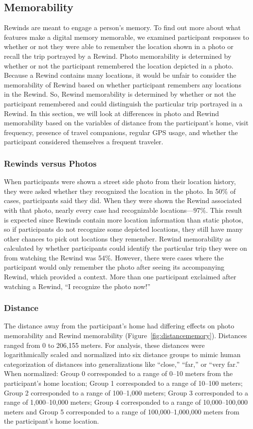 \documentclass{sigchi}
\begin{document}
\subsection{Memorability}
Rewinds are meant to engage a person's memory. To find out more about what features make a digital memory memorable, we examined participant responses to whether or not they were able to remember the location shown in a photo or recall the trip portrayed by a Rewind. Photo memorability is determined by whether or not the participant remembered the location depicted in a photo. Because a Rewind contains many locations, it would be unfair to consider the memorability of Rewind based on whether participant remembers any locations in the Rewind. So, Rewind memorability is determined by whether or not the participant remembered and could distinguish the particular trip portrayed in a Rewind. In this section, we will look at differences in photo and Rewind memorability based on the variables of distance from the participant's home, visit frequency, presence of travel companions, regular GPS usage, and whether the participant considered themselves a frequent traveler.

\subsubsection{Rewinds versus Photos}
When participants were shown a street side photo from their location history, they were asked whether they recognized the location in the photo. In 50\% of cases, participants said they did. When they were shown the Rewind associated with that photo, nearly every case had recognizable locations---97\%. This result is expected since Rewinds contain more location information than static photos, so if participants do not recognize some depicted locations, they still have many other chances to pick out locations they remember. Rewind memorability as calculated by whether participants could identify the particular trip they were on from watching the Rewind was 54\%. However, there were cases where the participant would only remember the photo after seeing its accompanying Rewind, which provided a context. More than one participant exclaimed after watching a Rewind, ``I recognize the photo now!''

\subsubsection{Distance}
The distance away from the participant’s home had differing effects on photo memorability and Rewind memorability (Figure~\ref{fig:distancememory}). Distances ranged from 0 to 206,155 meters. For analysis, these distances were logarithmically scaled and normalized into six distance groups to mimic human categorization of distances into generalizations like ``close,'' ``far,'' or ``very far.'' When normalized: Group 0 corresponded to a range of 0--10 meters from the participant's home location; Group 1 corresponded to a range of 10--100 meters; Group 2 corresponded to a range of 100--1,000 meters; Group 3 corresponded to a range of 1,000--10,000 meters; Group 4 corresponded to a range of 10,000--100,000 meters and Group 5 corresponded to a range of 100,000--1,000,000 meters from the participant's home location. 
\end{document}
